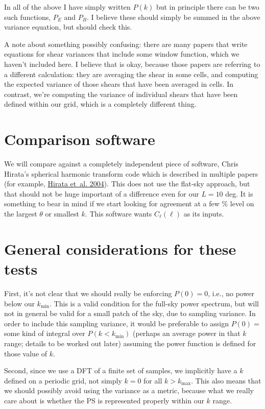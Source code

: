 \documentclass[preprint]{aastex}
\newcommand{\kmax}{\ensuremath{k_\mathrm{max}}}
\newcommand{\kmin}{\ensuremath{k_\mathrm{min}}}
\begin{document}
In all of the above I have simply written $P(k)$ but in principle there can be
two such functions, $P_{E}$ and $P_B$.  I believe these
should simply be summed in the above variance equation, but should check this.

A note about something possibly confusing: there are many papers that
write equations for shear variances that include some window function,
which we haven't included here.  I believe that is okay, because those
papers are referring to a different calculation: they are averaging
the shear in some cells, and computing the expected variance of those
shears that have been averaged in cells.  In contrast, we're computing
the variance of individual shears that have been defined within our
grid, which is a completely different thing.

\section{Comparison software}

We will compare against a completely independent piece of software,
Chris Hirata's spherical harmonic transform code which is described in
multiple papers (for example,
\href{http://adsabs.harvard.edu/abs/2004PhRvD..70j3501H}{Hirata
  et~al. 2004}).  This does not use the flat-sky
approach, but that should not be huge important of a difference even
for our $L=10$ deg.  It is something to bear in mind if we start
looking for agreement at a few \% level on the largest $\theta$ or
smallest $k$.  This software wants $C_\ell(\ell)$ as its inputs.

\section{General considerations for these tests}

First, it's not clear that we should really be enforcing $P(0)=0$,
i.e., no power below our \kmin.
This is a valid condition for the full-sky power spectrum, but will
not in general be valid for a small patch of the sky, due to sampling
variance.  In order to include this sampling variance, it would be
preferable to assign $P(0)=$ some kind of integral over $P(k<\kmin)$
(perhaps an average power in that $k$ range; details to be worked out later) assuming the power function is
defined for those value of $k$.

Second, since we use a DFT of a finite set of samples, we implicitly
have a $k$ defined on a periodic grid, not simply $k=0$ for all
$k>\kmax$.  This also means that we should possibly avoid using the
variance as a metric, because what we really care about is whether the
PS is represented properly within our $k$ range.
\end{document}
